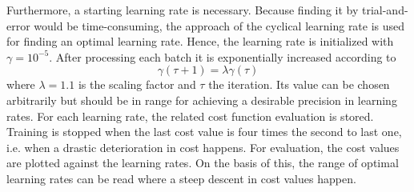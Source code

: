 Furthermore, a starting learning rate is necessary.
Because finding it by trial-and-error would be time-consuming, the approach of the cyclical learning rate is used for finding an optimal learning rate.
Hence, the learning rate is initialized with $\gamma = 10^{-5}$.
After processing each batch it is exponentially increased according to
\begin{equation}
	\gamma(\tau+1) = \lambda \gamma(\tau)
\end{equation}
where $\lambda = 1.1$ is the scaling factor and $\tau$ the iteration.
Its value can be chosen arbitrarily but should be in range for achieving a desirable precision in learning rates.
For each learning rate, the related cost function evaluation is stored.
Training is stopped when the last cost value is four times the second to last one, i.e. when a drastic deterioration in cost happens.
For evaluation, the cost values are plotted against the learning rates.
On the basis of this, the range of optimal learning rates can be read where a steep descent in cost values happen. 
